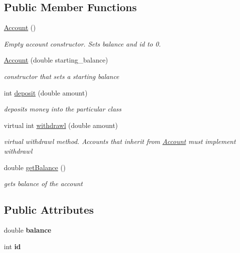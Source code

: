 \subsection*{Public Member Functions}
\begin{DoxyCompactItemize}
\item 
\hypertarget{classAccount_a366660970b5eeb5c17436062327f1b14}{\hyperlink{classAccount_a366660970b5eeb5c17436062327f1b14}{Account} ()}\label{classAccount_a366660970b5eeb5c17436062327f1b14}

\begin{DoxyCompactList}\small\item\em Empty account constructor. Sets balance and id to 0. \end{DoxyCompactList}\item 
\hyperlink{classAccount_a8aec0e7394567f9fad51e5c2ca74ba02}{Account} (double starting\-\_\-balance)
\begin{DoxyCompactList}\small\item\em constructor that sets a starting balance \end{DoxyCompactList}\item 
int \hyperlink{classAccount_a577fd69104cecb1115094f191e539e03}{deposit} (double amount)
\begin{DoxyCompactList}\small\item\em deposits money into the particular class \end{DoxyCompactList}\item 
virtual int \hyperlink{classAccount_afe06e68bfc0e09eee1d39093c8f84704}{withdrawl} (double amount)
\begin{DoxyCompactList}\small\item\em virtual withdrawl method. Accounts that inherit from \hyperlink{classAccount}{Account} must implement withdrawl \end{DoxyCompactList}\item 
double \hyperlink{classAccount_a60839724cf983feea4546148ceabcc5f}{get\-Balance} ()
\begin{DoxyCompactList}\small\item\em gets balance of the account \end{DoxyCompactList}\end{DoxyCompactItemize}
\subsection*{Public Attributes}
\begin{DoxyCompactItemize}
\item 
\hypertarget{classAccount_a6e41f403b4813738ba835377f212de33}{double {\bfseries balance}}\label{classAccount_a6e41f403b4813738ba835377f212de33}

\item 
\hypertarget{classAccount_a296dcba09b2c9e7234a6b2afd3ce0ffb}{int {\bfseries id}}\label{classAccount_a296dcba09b2c9e7234a6b2afd3ce0ffb}

\end{DoxyCompactItemize}


